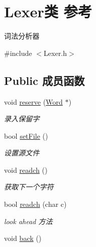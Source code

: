 \hypertarget{class_lexer}{}\section{Lexer类 参考}
\label{class_lexer}


词法分析器  




{\ttfamily \#include $<$Lexer.\+h$>$}

\subsection*{Public 成员函数}
\begin{DoxyCompactItemize}
\item 
void \hyperlink{class_lexer_ae96c693bf6eba38f21adab5fc94c18b1}{reserve} (\hyperlink{class_word}{Word} $\ast$)\hypertarget{class_lexer_ae96c693bf6eba38f21adab5fc94c18b1}{}\label{class_lexer_ae96c693bf6eba38f21adab5fc94c18b1}

\begin{DoxyCompactList}\small\item\em 录入保留字 \end{DoxyCompactList}\item 
bool \hyperlink{class_lexer_a3fafe4fb32f4da95a08d1062996b0409}{set\+File} ()\hypertarget{class_lexer_a3fafe4fb32f4da95a08d1062996b0409}{}\label{class_lexer_a3fafe4fb32f4da95a08d1062996b0409}

\begin{DoxyCompactList}\small\item\em 设置源文件 \end{DoxyCompactList}\item 
void \hyperlink{class_lexer_a5c91a26ad6b4294bf7bb8d4c46ea529b}{readch} ()\hypertarget{class_lexer_a5c91a26ad6b4294bf7bb8d4c46ea529b}{}\label{class_lexer_a5c91a26ad6b4294bf7bb8d4c46ea529b}

\begin{DoxyCompactList}\small\item\em 获取下一个字符 \end{DoxyCompactList}\item 
bool \hyperlink{class_lexer_acbe68a5d98ebc3b3a87fd27f000030a5}{readch} (char c)
\begin{DoxyCompactList}\small\item\em look ahead 方法 \end{DoxyCompactList}\item 
void \hyperlink{class_lexer_ae28380e5c67144a1aeaf37f33ab11fb2}{back} ()\hypertarget{class_lexer_ae28380e5c67144a1aeaf37f33ab11fb2}{}\label{class_lexer_ae28380e5c67144a1aeaf37f33ab11fb2}


\end{DoxyCompactItemize}
